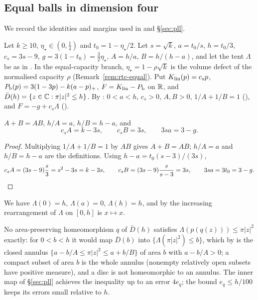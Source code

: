 \subsection{Equal balls in dimension four}\label{sec:fcp-equal}

We record the identities and margins used in  and \S\ref{sec:pll}.

Let $k\ge10$, $\eta_\star\in(0,\frac14)$ and $t_0=1-\eta_\star/2$. Let $s=\sqrt k$, $a=t_0/s$, $h=t_0/3$, $c_s=3s-9$, $g=3(1-t_0)=\frac32\eta_\star$, $A=h/a$, $B=h/(h-a)$, and let the tent $\Lambda$ be as in . In the equal-capacity branch, $\eta_\star=1-\rho\sqrt k$ is the volume defect of the normalised capacity $\rho$ (Remark~\ref{rem:rtc-equal}). Put $K_{\rm lin}(p)=c_sp$, $P_{\mathrm b}(p)=3(1-3p)-k(a-p)_+$, $F=K_{\rm lin}-P_{\mathrm b}$ on $\mathbb{R}$, and $\bar D(h)=\{z\in\mathbb{C}:\pi|z|^2\le h\}$. By : $0<a<h$, $c_s>0$, $A,B>0$, $1/A+1/B=1$ (), and $F=-g+c_s\Lambda$ ().

\begin{lemma}\label{lem:fcp-AB}
$A+B=AB$, $h/A=a$, $h/B=h-a$, and
\[
 c_sA=k-3s,\qquad c_sB=3s,\qquad 3sa=3-g .
\]
\end{lemma}

\begin{proof}
Multiplying $1/A+1/B=1$ by $AB$ gives $A+B=AB$; $h/A=a$ and $h/B=h-a$ are the definitions. Using
$h-a=t_0(s-3)/(3s)$,
\[
 c_sA=(3s-9)\frac s3=s^2-3s=k-3s,\qquad c_sB=(3s-9)\frac{s}{s-3}=3s,\qquad 3sa=3t_0=3-g .\qedhere
\]
\end{proof}

We have $\Lambda(0)=h$, $\Lambda(a)=0$, $\Lambda(h)=h$, and by  the increasing rearrangement of $\Lambda$ on $[0,h]$ is $x\mapsto x$.

No area-preserving homeomorphism $q$ of $\bar D(h)$ satisfies $\Lambda(p(q(z)))\le\pi|z|^2$ exactly: for $0<b<h$ it would map $\bar D(b)$ into $\{\Lambda(\pi|z|^2)\le b\}$, which by  is the closed annulus $\{a-b/A\le\pi|z|^2\le a+b/B\}$ of area $b$ with $a-b/A>0$; a compact subset of area $b$ is the whole annulus (nonempty relatively open subsets have positive measure), and a disc is not homeomorphic to an annulus. The inner map of \S\ref{sec:pll} achieves the inequality up to an error $4e_q$; the bound $e_q\le h/100$ keeps its errors small relative to $h$.


